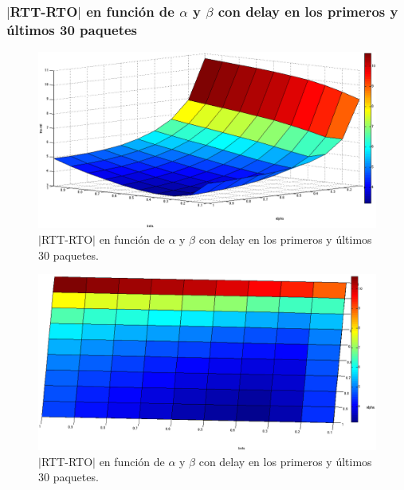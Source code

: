 \documentclass[10pt, a4paper]{article}
\begin{document}
\subsubsection{$|$RTT-RTO$|$ en función de $\alpha$ y $\beta$ con delay en los primeros y últimos 30 paquetes}
\begin{figure}[H]
\begin{center}
\includegraphics[width=17cm]{delay-30F.png}
\caption{$|$RTT-RTO$|$ en función de $\alpha$ y $\beta$ con delay en los primeros y últimos 30 paquetes.}
\end{center}
\end{figure}

\begin{figure}[H]
\begin{center}
\includegraphics[width=17cm]{delay-30F-costado.png}
\caption{$|$RTT-RTO$|$ en función de $\alpha$ y $\beta$ con delay en los primeros y últimos 30 paquetes.}
\end{center}
\end{figure}
\end{document}
